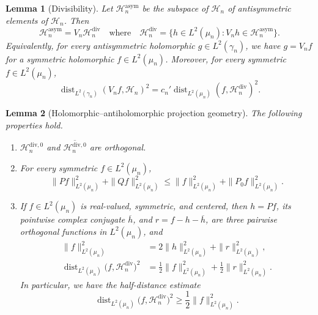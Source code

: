 \documentclass[10pt,a4paper]{amsart}
\newtheorem{lemma}{Lemma}
\begin{document}
\begin{lemma}[Divisibility]\label{le:divisibility}
  Let $\mathcal{H}_n^{\mathrm{asym}}$ be the subspace of $\mathcal{H}_n$ of
  antisymmetric elements of $\mathcal{H}_n$. Then
  \begin{equation}
    \mathcal{H}_n^{\mathrm{asym}}=V_n\mathcal{H}_n^{\mathrm{div}}
    \quad\text{where}\quad
    \mathcal{H}_n^{\mathrm{div}} = \{h\in
    L^2(\mu_n):V_nh\in\mathcal{H}_n^{\mathrm{asym}}\}.
  \end{equation}
  Equivalently, for every antisymmetric holomorphic $g\in L^2(\gamma_n)$, we have
  $g=V_nf$ for a symmetric holomorphic $f\in L^2(\mu_n)$. Moreover, for every
  symmetric $f\in L^2(\mu_n)$,
  \begin{equation}%
    \operatorname{dist}_{L^2(\gamma_n)}(V_nf,\mathcal{H}_n)^2
    =
    c_n'\operatorname{dist}_{L^2(\mu_n)}(f,\mathcal{H}_n^{\mathrm{div}})^2.
  \end{equation}
\end{lemma}

\begin{lemma}[Holomorphic--antiholomorphic projection geometry]
  \label{le:projection-geometry}
  The following properties hold.
  \begin{enumerate}
  \item
    $\mathcal{H}_n^{\mathrm{div},0}$ and
    $\overline{\mathcal{H}_n^{\mathrm{div},0}}$ are orthogonal.
  \item For every symmetric $f\in L^2(\mu_n)$,
    \begin{equation}\label{eq:two-projection-bound}
      \|Pf\|_{L^2(\mu_n)}^2+\|Qf\|_{L^2(\mu_n)}^2
      \leq
      \|f\|_{L^2(\mu_n)}^2+\|P_0f\|_{L^2(\mu_n)}^2.
    \end{equation}
  \item If $f\in L^2(\mu_n)$ is real-valued, symmetric, and centered, then
    $h=Pf$, its pointwise complex conjugate $\overline h$, and
    $r=f-h-\overline h$, are three pairwise orthogonal functions in $L^2(\mu_n)$, and
    \begin{align}
      \|f\|_{L^2(\mu_n)}^2
      &=2\|h\|_{L^2(\mu_n)}^2+\|r\|_{L^2(\mu_n)}^2,
      \label{eq:projection-geometry-decomposition}\\
      \operatorname{dist}_{L^2(\mu_n)}
      \bigl(f,\mathcal{H}_n^{\mathrm{div}}\bigr)^2
      &=\frac{1}{2}\|f\|_{L^2(\mu_n)}^2
        +\frac{1}{2}\|r\|_{L^2(\mu_n)}^2.
      \label{eq:exact-half-distance}
    \end{align}
    In particular, we have the half-distance estimate 
    \begin{equation}\label{eq:half-distance-paper}
      \operatorname{dist}_{L^2(\mu_n)}
      \bigl(f,\mathcal{H}_n^{\mathrm{div}}\bigr)^2
      \geq\frac{1}{2}\|f\|_{L^2(\mu_n)}^2.
    \end{equation}
  \end{enumerate}
\end{lemma}
\end{document}
